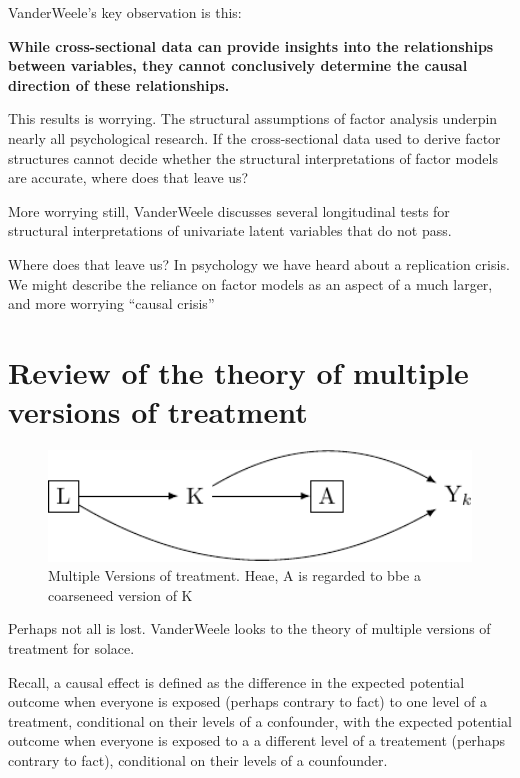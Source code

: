 \documentclass[
  singlecolumn]{report}
\begin{document}
VanderWeele's key observation is this:

\textbf{While cross-sectional data can provide insights into the
relationships between variables, they cannot conclusively determine the
causal direction of these relationships.}

This results is worrying. The structural assumptions of factor analysis
underpin nearly all psychological research. If the cross-sectional data
used to derive factor structures cannot decide whether the structural
interpretations of factor models are accurate, where does that leave us?

More worrying still, VanderWeele discusses several longitudinal tests
for structural interpretations of univariate latent variables that do
not pass.

Where does that leave us? In psychology we have heard about a
replication crisis. We might describe the reliance on factor models as
an aspect of a much larger, and more worrying ``causal crisis''

\hypertarget{review-of-the-theory-of-multiple-versions-of-treatment}{%
\section{Review of the theory of multiple versions of
treatment}\label{review-of-the-theory-of-multiple-versions-of-treatment}}

\begin{figure}

{\centering \includegraphics[width=1\textwidth,height=\textheight]{causal-dags_files/figure-pdf/fig_dag_multiple_version_treatment_dag-1.pdf}

}

\caption{Multiple Versions of treatment. Heae, A is regarded to bbe a
coarseneed version of K}

\end{figure}

Perhaps not all is lost. VanderWeele looks to the theory of multiple
versions of treatment for solace.

Recall, a causal effect is defined as the difference in the expected
potential outcome when everyone is exposed (perhaps contrary to fact) to
one level of a treatment, conditional on their levels of a confounder,
with the expected potential outcome when everyone is exposed to a a
different level of a treatement (perhaps contrary to fact), conditional
on their levels of a counfounder.
\end{document}
